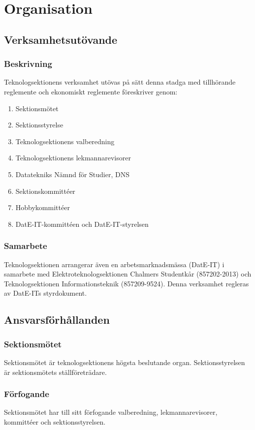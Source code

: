 \documentclass[a4paper]{dtek}
\begin{document}
\section{Organisation}
\subsection{Verksamhetsutövande}
\subsubsection{Beskrivning}
Teknologsektionens verksamhet utövas på sätt denna stadga med tillhörande reglemente och ekonomiskt reglemente föreskriver genom:
\begin{enumerate}
\item Sektionsmötet
\item Sektionsstyrelse
\item Teknologsektionens valberedning
\item Teknologsektionens lekmannarevisorer
\item Datatekniks Nämnd för Studier, DNS
\item Sektionskommittéer
\item Hobbykommittéer
\item DatE-IT-kommittéen och DatE-IT-styrelsen
\end{enumerate}

\subsubsection{Samarbete}
Teknologsektionen arrangerar även en arbetsmarknadsmässa (DatE-IT) i samarbete med Elektroteknologsektionen Chalmers Studentkår (857202-2013) och Teknologsektionen Informationsteknik (857209-9524). Denna verksamhet regleras av DatE-ITs styrdokument. 
  
\subsection{Ansvarsförhållanden}
\subsubsection{Sektionsmötet}
Sektionsmötet är teknologsektionens högsta beslutande organ. Sektionsstyrelsen är sektionsmötets ställföreträdare.
\subsubsection{Förfogande}
Sektionsmötet har till sitt förfogande valberedning, lekmannarevisorer, kommittéer och sektionsstyrelsen.
\newpage
\end{document}
